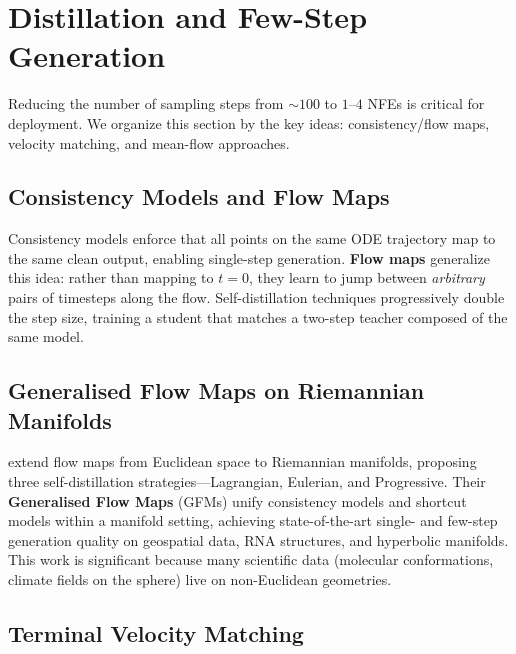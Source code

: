 \documentclass[11pt]{article}
\begin{document}
\section{Distillation and Few-Step Generation}
\label{sec:distillation}

Reducing the number of sampling steps from $\sim\!100$ to $1$--$4$ NFEs is critical for deployment.
We organize this section by the key ideas: consistency/flow maps, velocity matching, and mean-flow approaches.

\subsection{Consistency Models and Flow Maps}

Consistency models \citep{song2023consistency} enforce that all points on the same ODE trajectory map to the same clean output, enabling single-step generation.
\textbf{Flow maps} generalize this idea: rather than mapping to $t=0$, they learn to jump between \emph{arbitrary} pairs of timesteps along the flow.
Self-distillation techniques progressively double the step size, training a student that matches a two-step teacher composed of the same model.

\subsection{Generalised Flow Maps on Riemannian Manifolds}

\citet{davis2025gfm} extend flow maps from Euclidean space to Riemannian manifolds, proposing three self-distillation strategies---Lagrangian, Eulerian, and Progressive.
Their \textbf{Generalised Flow Maps} (GFMs) unify consistency models and shortcut models within a manifold setting, achieving state-of-the-art single- and few-step generation quality on geospatial data, RNA structures, and hyperbolic manifolds.
This work is significant because many scientific data (molecular conformations, climate fields on the sphere) live on non-Euclidean geometries.

\subsection{Terminal Velocity Matching}
\end{document}
